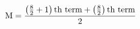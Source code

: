 \documentclass[preview]{standalone}
\begin{document}
\begin{align*}
\text M = \frac{\left(\frac{8}{2} + 1\right)\text{th term} + \left(\frac{8}{2}\right)\text{th term}}{2}
\end{align*}
\end{document}
